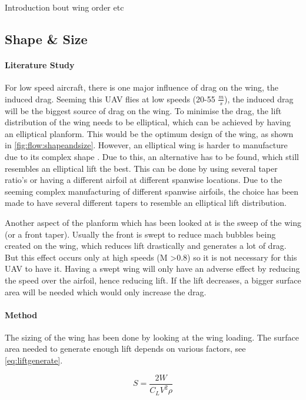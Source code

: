 Introduction bout wing order etc

\subsection*{Shape \& Size}

\paragraph{Literature Study} For low speed aircraft, there is one major influence of drag on the wing, the induced drag. Seeming this UAV flies at low speeds (20-55 $\frac{m}{s}$), the induced drag will be the biggest source of drag on the wing. To minimise the drag, the lift distribution of the wing needs to be elliptical, which can be achieved by having an elliptical planform. This would be the optimum design of the wing, as shown in \autoref{fig:flow:shapeandsize}. However, an elliptical wing is harder to manufacture due to its complex shape \cite{ellipticalmanu}. Due to this, an alternative has to be found, which still resembles an elliptical lift the best. This can be done by using several taper ratio's or having a different airfoil at different spanwise locations. Due to the seeming complex manufacturing of different spanwise airfoils, the choice has been made to have several different tapers to resemble an elliptical lift distribution.

Another aspect of the planform which has been looked at is the sweep of the wing (or a front taper). Usually the front is swept to reduce mach bubbles being created on the wing, which reduces lift drastically and generates a lot of drag. But this effect occurs only at high speeds (M \textgreater 0.8) so it is not necessary for this UAV to have it. Having a swept wing will only have an adverse effect by reducing the speed over the airfoil, hence reducing lift. If the lift decreases, a bigger surface area will be needed which would only increase the drag.

\paragraph{Method} The sizing of the wing has been done by looking at the wing loading. The surface area needed to generate enough lift depends on various factors, see \autoref{eq:liftgenerate}.

\begin{equation}
    S = \frac{2W}{C_{L} V^2 \rho}
\end{equation}

